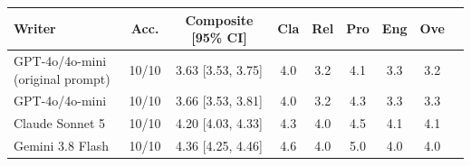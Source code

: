 \begin{tabular}{lcccccccc}
\toprule
Writer & Acc. & Composite [95\% CI] & Cla & Rel & Pro & Eng & Ove \\
\midrule
GPT-4o/4o-mini (original prompt) & 10/10 & 3.63 [3.53, 3.75] & 4.0 & 3.2 & 4.1 & 3.3 & 3.2 \\
\midrule
GPT-4o/4o-mini & 10/10 & 3.66 [3.53, 3.81] & 4.0 & 3.2 & 4.3 & 3.3 & 3.3 \\
Claude Sonnet 5 & 10/10 & 4.20 [4.03, 4.33] & 4.3 & 4.0 & 4.5 & 4.1 & 4.1 \\
Gemini 3.8 Flash & 10/10 & 4.36 [4.25, 4.46] & 4.6 & 4.0 & 5.0 & 4.0 & 4.0 \\
\bottomrule
\end{tabular}
